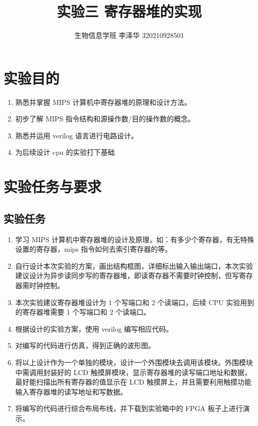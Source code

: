 \documentclass[AutoFakeBold]{LZUThesis}
\begin{document}
\title{{实验三 寄存器堆的实现}}


\author{生物信息学班 李泽华 320210928501}


\frontmatter




\mainmatter

\chapter{实验目的}
\begin{enumerate}
    \item 熟悉并掌握 MIPS 计算机中寄存器堆的原理和设计方法。
    \item 初步了解 MIPS 指令结构和源操作数/目的操作数的概念。
    \item 熟悉并运用 verilog 语言进行电路设计。
    \item 为后续设计 cpu 的实验打下基础
\end{enumerate}

\chapter{实验任务与要求}
\section{实验任务}
\begin{enumerate}
    \item 学习 MIPS 计算机中寄存器堆的设计及原理，如：有多少个寄存器，有无特殊设置的寄存器，mips 指令如何去索引寄存器的等。
    \item 自行设计本次实验的方案，画出结构框图，详细标出输入输出端口，本次实验建议设计为异步读同步写的寄存器堆，即读寄存器不需要时钟控制，但写寄存器需时钟控制。
    \item 本次实验建议寄存器堆设计为 1 个写端口和 2 个读端口，后续 CPU 实验用到的寄存器堆需要 1 个写端口和 2 个读端口。
    \item 根据设计的实验方案，使用 verilog 编写相应代码。
    \item 对编写的代码进行仿真，得到正确的波形图。
    \item 将以上设计作为一个单独的模块，设计一个外围模块去调用该模块。外围模块中需调用封装好的 LCD 触摸屏模块，显示寄存器堆的读写端口地址和数据，最好能扫描出所有寄存器的值显示在 LCD 触摸屏上，并且需要利用触摸功能输入寄存器堆的读写地址和写数据。
    \item 将编写的代码进行综合布局布线，并下载到实验箱中的 FPGA 板子上进行演示。
\end{enumerate}
\end{document}
